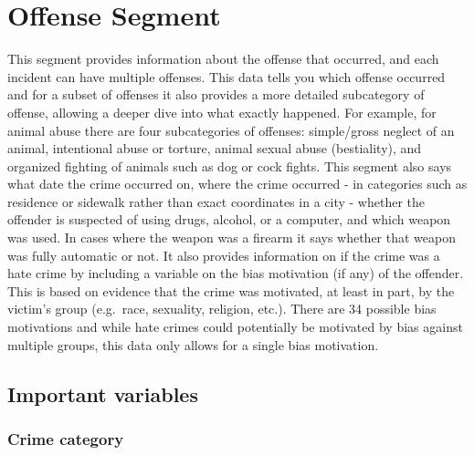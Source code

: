 \documentclass[
  12pt,
  openany]{book}
\begin{document}
\hypertarget{offense-segment-1}{%
\chapter{Offense Segment}\label{offense-segment-1}}

This segment provides information about the offense that occurred, and each incident can have multiple offenses. This data tells you which offense occurred and for a subset of offenses it also provides a more detailed subcategory of offense, allowing a deeper dive into what exactly happened. For example, for animal abuse there are four subcategories of offenses: simple/gross neglect of an animal, intentional abuse or torture, animal sexual abuse (bestiality), and organized fighting of animals such as dog or cock fights. This segment also says what date the crime occurred on, where the crime occurred - in categories such as residence or sidewalk rather than exact coordinates in a city - whether the offender is suspected of using drugs, alcohol, or a computer, and which weapon was used. In cases where the weapon was a firearm it says whether that weapon was fully automatic or not. It also provides information on if the crime was a hate crime by including a variable on the bias motivation (if any) of the offender. This is based on evidence that the crime was motivated, at least in part, by the victim's group (e.g.~race, sexuality, religion, etc.). There are 34 possible bias motivations and while hate crimes could potentially be motivated by bias against multiple groups, this data only allows for a single bias motivation.

\hypertarget{important-variables-1}{%
\section{Important variables}\label{important-variables-1}}

\hypertarget{crime-category}{%
\subsection{Crime category}\label{crime-category}}
\end{document}
